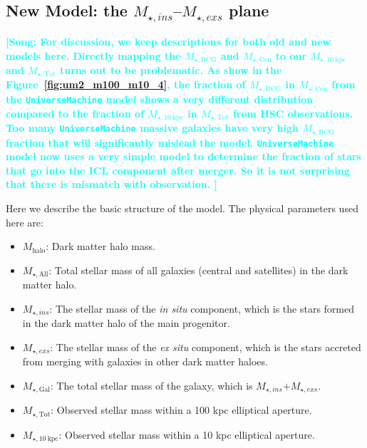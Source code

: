\documentclass[a4paper,fleqn,usenatbib]{mnras}
\def\mhalo{{$M_{\mathrm{halo}}$}}
\def\mtot{{$M_{\star,\mathrm{Tot}}$}}
\def\minn{{$M_{\star,10\ \mathrm{kpc}}$}}
\def\mall{{$M_{\star,\mathrm{All}}$}}
\def\mbcg{{$M_{\star,\mathrm{BCG}}$}}
\def\mcen{{$M_{\star,\mathrm{Cen}}$}}
\def\mgal{{$M_{\star,\mathrm{Gal}}$}}
\def\um{\texttt{UniverseMachine}}
\def\insitu{\textit{in situ}}
\def\exsitu{\textit{ex situ}}
\def\mins{{$M_{\star,ins}$}}
\def\macc{{$M_{\star,exs}$}}
\newcommand{\song}[1]{\textcolor{cyan}{\textbf{[Song: #1]}}}
\begin{document}
\subsection{New Model: the \mins{}--\macc{} plane}
    \label{ssec:new_m100_m10}

    \song{For discussion, we keep descriptions for both old and new models here.  
          Directly mapping the \mbcg{} and \mcen{} to our \minn{} and \mtot{}
          turns out to be problematic.  
          As show in the Figure~\ref{fig:um2_m100_m10_4}, the fraction of \mbcg{}
          in \mcen{} from the \um{} model shows a very different distribution 
          compared to the fraction of \minn{} in \mtot{} from HSC observations. 
          Too many \um{} massive galaxies have very high \mbcg{} fraction that 
          will significantly mislead the model. 
          \um{} model now uses a very simple model to determine the fraction of 
          stars that go into the ICL component after merger.  
          So it is not surprising that there is mismatch with observation. 
          }
          
    Here we describe the basic structure of the model. 
    The physical parameters used here are: 

    \begin{itemize}
    
        \item \mhalo{}: Dark matter halo mass. 
        
        \item \mall{}: Total stellar mass of all galaxies (central and satellites)
            in the dark matter halo.
        
        \item \mins{}: The stellar mass of the \insitu{} component, which is the 
            stars formed in the dark matter halo of the main progenitor.
        
        \item \macc{}: The stellar mass of the \exsitu{} component, which is the 
            stars accreted from merging with galaxies in other dark matter haloes. 
        
        \item \mgal{}: The total stellar mass of the galaxy, which is 
            \mins{}$+$\macc{}.
        
        \item \mtot{}: Observed stellar mass within a 100 kpc elliptical aperture. 
        
        \item \minn{}: Observed stellar mass within a 10 kpc elliptical aperture. 

    \end{itemize}
\end{document}
